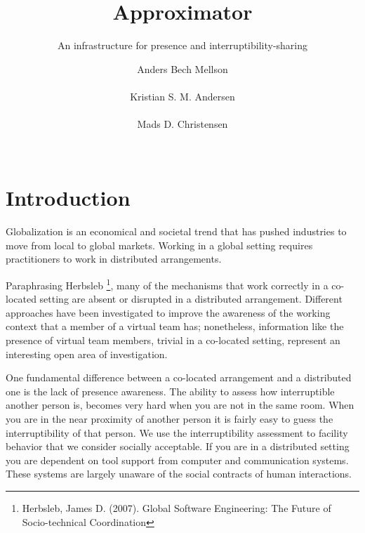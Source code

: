 \documentclass{sigchi}
\begin{document}
\title{Approximator}
\subtitle{An infrastructure for presence and interruptibility-sharing}
\author{
  \alignauthor Anders Bech Mellson\\
    \\
  \alignauthor Kristian S. M. Andersen\\
    \\
  \alignauthor Mads D. Christensen\\
    \\
}

\maketitle

\begin{abstract}

\end{abstract}



\section{Introduction}
Globalization is an economical and societal trend that has pushed industries to move from local to global markets.
Working in a global setting requires practitioners to work in distributed arrangements.

Paraphrasing Herbsleb \footnote{Herbsleb, James D. (2007). Global Software Engineering: The Future of Socio-technical Coordination}, many of the mechanisms that work correctly in a co-located setting are absent or disrupted in a distributed arrangement.
Different approaches have been investigated to improve the awareness of the working context that a member of a virtual team has; nonetheless, information like the presence of virtual team members, trivial in a co-located setting, represent an interesting open area of investigation.

One fundamental difference between a co-located arrangement and a distributed one is the lack of presence awareness.
The ability to assess how interruptible another person is, becomes very hard when you are not in the same room.
When you are in the near proximity of another person it is fairly easy to guess the interruptibility of that person.
We use the interruptibility assessment to facility behavior that we consider socially acceptable.
If you are in a distributed setting you are dependent on tool support from computer and communication systems.
These systems are largely unaware of the social contracts of human interactions.
\end{document}
